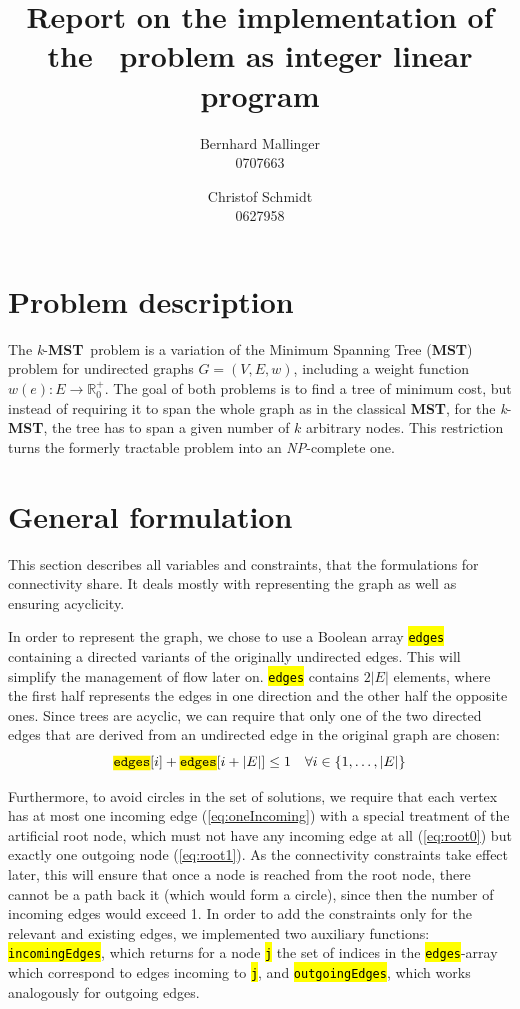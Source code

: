 \documentclass[,%
			paper=a4,%
			DIV14,
			liststotoc,
			bibtotoc,
			draft=false,%
			numbers=noendperiod
			]{scrartcl}
\title{Report on the implementation of the \kmst\ problem as integer linear program}
\author{Bernhard Mallinger \\ 0707663 \and Christof Schmidt \\ 0627958}
\newcommand{\mst}{\textbf{MST}}
\newcommand{\kmst}{\textit{k}-\mst}
\newcommand{\ilc}[1]{\hl{\texttt{#1}}} %
\newcommand{\edge}{i}
\newcommand{\forallFirstEdges}{\ensuremath{\forall \edge \in \{1, \dotsc, |E|\}}}
\begin{document}
\maketitle

\section{Problem description}

The \kmst\ problem is a variation of the Minimum Spanning Tree (\mst) problem for undirected graphs $G = (V, E, w)$, including a weight function $w(e) : E \rightarrow \mathbb{R}^+_0$.
The goal of both problems is to find a tree of minimum cost, but instead of requiring it to span the whole graph as in the classical \mst, for the \kmst, the tree has to span a given number of $k$ arbitrary nodes.
This restriction turns the formerly tractable problem into an \textit{NP}-complete one.

\section{General formulation}

This section describes all variables and constraints, that the formulations for connectivity share. It deals mostly with representing the graph as well as ensuring acyclicity.

In order to represent the graph, we chose to use a Boolean array \ilc{edges} containing a directed variants of the originally undirected edges.
This will simplify the management of flow later on.
\ilc{edges} contains $2|E|$ elements, where the first half represents the edges in one direction and the other half the opposite ones.
Since trees are acyclic, we can require that only one of the two directed edges that are derived from an undirected edge in the original graph are chosen:
\begin{equation}
 \ilc{edges}[i] + \ilc{edges}[i + |E|] \leq 1\quad\forallFirstEdges
\end{equation}

Furthermore, to avoid circles in the set of solutions, we require that each vertex has at most one incoming edge (\eqref{eq:oneIncoming}) with a special treatment of the artificial root node, which must not have any incoming edge at all (\eqref{eq:root0}) but exactly one outgoing node (\eqref{eq:root1}). 
As the connectivity constraints take effect later, this will ensure that once a node is reached from the root node, there cannot be a path back it (which would form a circle), since then the number of incoming edges would exceed 1.
In order to add the constraints only for the relevant and existing edges, we implemented two auxiliary functions: \ilc{incomingEdges}, which returns for a node \ilc{j} the set of indices in the \ilc{edges}-array which correspond to edges incoming to \ilc{j}, and \ilc{outgoingEdges}, which works analogously for outgoing edges.
\end{document}
